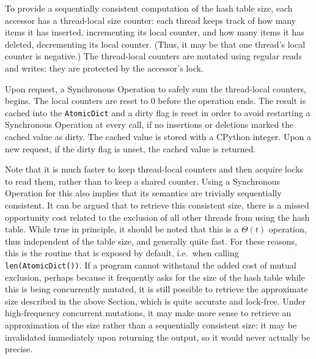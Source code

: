 To provide a sequentially consistent computation of the hash table size, each accessor has a thread-local size counter: each thread keeps track of how many items it has inserted, incrementing its local counter, and how many items it has deleted, decrementing its local counter.
(Thus, it may be that one thread's local counter is negative.)
The thread-local counters are mutated using regular reads and writes: they are protected by the accessor's lock.

Upon request, a Synchronous Operation to safely sum the thread-local counters, begins.
The local counters are reset to 0 before the operation ends.
The result is cached into the \texttt{AtomicDict} and a dirty flag is reset in order to avoid restarting a Synchronous Operation at every call, if no insertions or deletions marked the cached value as dirty.
The cached value is stored with a CPython integer.
Upon a new request, if the dirty flag is unset, the cached value is returned.

Note that it is much faster to keep thread-local counters and then acquire locks to read them, rather than to keep a shared counter.
Using a Synchronous Operation for this also implies that its semantics are trivially sequentially consistent.
It can be argued that to retrieve this consistent size, there is a missed opportunity cost related to the exclusion of all other threads from using the hash table.
While true in principle, it should be noted that this is a $\Theta(t)$ operation, thus independent of the table size, and generally quite fast.
For these reasons, this is the routine that is exposed by default, i.e.\ when calling \texttt{{len(AtomicDict())}}.
If a program cannot withstand the added cost of mutual exclusion, perhaps because it frequently asks for the size of the hash table while this is being concurrently mutated, it is still possible to retrieve the approximate size described in the above Section, which is quite accurate and lock-free.
Under high-frequency concurrent mutations, it may make more sense to retrieve an approximation of the size rather than a sequentially consistent size: it may be invalidated immediately upon returning the output, so it would never actually be precise.

